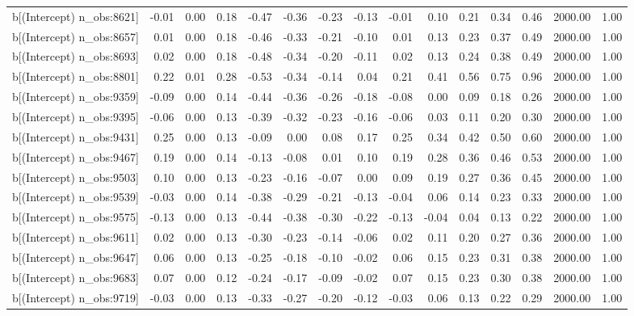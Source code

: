 \begin{table}[ht]
\begin{tabular}{rrrrrrrrrrrrrrr}
  b[(Intercept) n\_obs:8621] & -0.01 & 0.00 & 0.18 & -0.47 & -0.36 & -0.23 & -0.13 & -0.01 & 0.10 & 0.21 & 0.34 & 0.46 & 2000.00 & 1.00 \\ 
  b[(Intercept) n\_obs:8657] & 0.01 & 0.00 & 0.18 & -0.46 & -0.33 & -0.21 & -0.10 & 0.01 & 0.13 & 0.23 & 0.37 & 0.49 & 2000.00 & 1.00 \\ 
  b[(Intercept) n\_obs:8693] & 0.02 & 0.00 & 0.18 & -0.48 & -0.34 & -0.20 & -0.11 & 0.02 & 0.13 & 0.24 & 0.38 & 0.49 & 2000.00 & 1.00 \\ 
  b[(Intercept) n\_obs:8801] & 0.22 & 0.01 & 0.28 & -0.53 & -0.34 & -0.14 & 0.04 & 0.21 & 0.41 & 0.56 & 0.75 & 0.96 & 2000.00 & 1.00 \\ 
  b[(Intercept) n\_obs:9359] & -0.09 & 0.00 & 0.14 & -0.44 & -0.36 & -0.26 & -0.18 & -0.08 & 0.00 & 0.09 & 0.18 & 0.26 & 2000.00 & 1.00 \\ 
  b[(Intercept) n\_obs:9395] & -0.06 & 0.00 & 0.13 & -0.39 & -0.32 & -0.23 & -0.16 & -0.06 & 0.03 & 0.11 & 0.20 & 0.30 & 2000.00 & 1.00 \\ 
  b[(Intercept) n\_obs:9431] & 0.25 & 0.00 & 0.13 & -0.09 & 0.00 & 0.08 & 0.17 & 0.25 & 0.34 & 0.42 & 0.50 & 0.60 & 2000.00 & 1.00 \\ 
  b[(Intercept) n\_obs:9467] & 0.19 & 0.00 & 0.14 & -0.13 & -0.08 & 0.01 & 0.10 & 0.19 & 0.28 & 0.36 & 0.46 & 0.53 & 2000.00 & 1.00 \\ 
  b[(Intercept) n\_obs:9503] & 0.10 & 0.00 & 0.13 & -0.23 & -0.16 & -0.07 & 0.00 & 0.09 & 0.19 & 0.27 & 0.36 & 0.45 & 2000.00 & 1.00 \\ 
  b[(Intercept) n\_obs:9539] & -0.03 & 0.00 & 0.14 & -0.38 & -0.29 & -0.21 & -0.13 & -0.04 & 0.06 & 0.14 & 0.23 & 0.33 & 2000.00 & 1.00 \\ 
  b[(Intercept) n\_obs:9575] & -0.13 & 0.00 & 0.13 & -0.44 & -0.38 & -0.30 & -0.22 & -0.13 & -0.04 & 0.04 & 0.13 & 0.22 & 2000.00 & 1.00 \\ 
  b[(Intercept) n\_obs:9611] & 0.02 & 0.00 & 0.13 & -0.30 & -0.23 & -0.14 & -0.06 & 0.02 & 0.11 & 0.20 & 0.27 & 0.36 & 2000.00 & 1.00 \\ 
  b[(Intercept) n\_obs:9647] & 0.06 & 0.00 & 0.13 & -0.25 & -0.18 & -0.10 & -0.02 & 0.06 & 0.15 & 0.23 & 0.31 & 0.38 & 2000.00 & 1.00 \\ 
  b[(Intercept) n\_obs:9683] & 0.07 & 0.00 & 0.12 & -0.24 & -0.17 & -0.09 & -0.02 & 0.07 & 0.15 & 0.23 & 0.30 & 0.38 & 2000.00 & 1.00 \\ 
  b[(Intercept) n\_obs:9719] & -0.03 & 0.00 & 0.13 & -0.33 & -0.27 & -0.20 & -0.12 & -0.03 & 0.06 & 0.13 & 0.22 & 0.29 & 2000.00 & 1.00 \\ 

\end{tabular}
\end{table}
